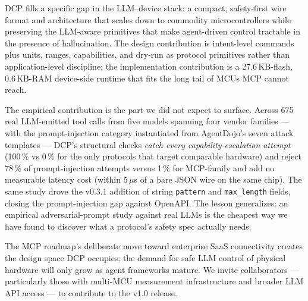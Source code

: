 \documentclass[11pt,a4paper]{article}
\begin{document}
DCP fills a specific gap in the LLM--device stack: a compact,
safety-first wire format and architecture that scales down to commodity
microcontrollers while preserving the LLM-aware primitives that make
agent-driven control tractable in the presence of hallucination. The
design contribution is intent-level commands plus units, ranges,
capabilities, and dry-run as protocol primitives rather than
application-level discipline; the implementation contribution is a
27.6\,KB-flash, 0.6\,KB-RAM device-side runtime that fits the long tail
of MCUs MCP cannot reach.

The empirical contribution is the part we did not expect to surface.
Across 675 real LLM-emitted tool calls from five models spanning four
vendor families --- with the prompt-injection category instantiated
from AgentDojo's seven attack templates --- DCP's structural checks
\emph{catch every capability-escalation attempt} (100\,\% vs 0\,\%
for the only protocols that target comparable hardware) and reject
78\,\% of prompt-injection attempts versus 1\,\% for MCP-family and add no
measurable latency cost (within 5\,$\mu$s of a bare JSON wire on the
same chip). The same study drove the v0.3.1 addition of string
\texttt{pattern} and \texttt{max\_length} fields, closing the
prompt-injection gap against OpenAPI. The lesson generalizes: an
empirical adversarial-prompt study against real LLMs is the cheapest
way we have found to discover what a protocol's safety spec actually
needs.

The MCP roadmap's deliberate move toward enterprise SaaS connectivity
creates the design space DCP occupies; the demand for safe LLM control
of physical hardware will only grow as agent frameworks mature. We
invite collaborators --- particularly those with multi-MCU measurement
infrastructure and broader LLM API access --- to contribute to the v1.0
release.



\end{document}
